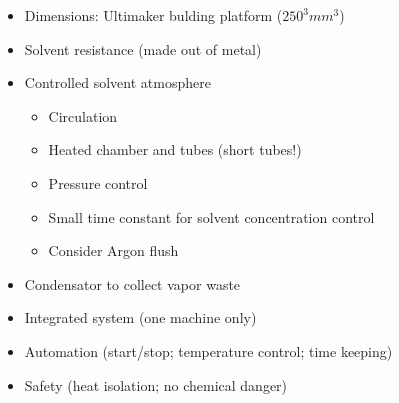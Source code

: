 \documentclass[a4paper, 12pt]{paper}
\begin{document}
\begin{itemize}
\item Dimensions: Ultimaker bulding platform ($250^3 mm^3$)
\item Solvent resistance (made out of metal)
\item Controlled solvent atmosphere
    \begin{itemize}
        \item Circulation
        \item Heated chamber and tubes (short tubes!)
        \item Pressure control
        \item Small time constant for solvent concentration control
        \item Consider Argon flush
    \end{itemize}
\item Condensator to collect vapor waste
\item Integrated system (one machine only)
\item Automation (start/stop; temperature control; time keeping)
\item Safety (heat isolation; no chemical danger)
\end{itemize}
\end{document}
